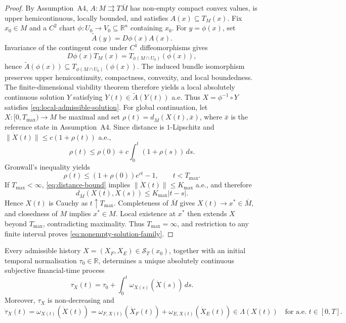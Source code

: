\documentclass[graybox,natbib]{SNmult}
\providecommand{\1}{}
\renewcommand{\1}{\mathbbm 1}
\begin{document}
\begin{proof}
By Assumption~A4, \(A:M\rightrightarrows T\overline M\) has non-empty compact
convex values, is upper hemicontinuous, locally bounded, and satisfies
\(A(x)\subseteq T_M(x)\). Fix \(x_0\in M\) and a \(C^2\) chart
\(\phi:U_0\to V_0\subseteq\mathbb R^n\) containing \(x_0\). For
\(y=\phi(x)\), set
\[
\widetilde A(y)=D\phi(x)A(x).
\]
Invariance of the contingent cone under \(C^1\) diffeomorphisms gives
\[
D\phi(x)T_M(x)
=
T_{\phi(M\cap U_0)}(\phi(x)),
\]
hence
\(\widetilde A(\phi(x))
\subseteq T_{\phi(M\cap U_0)}(\phi(x))\).
The induced bundle isomorphism preserves upper hemicontinuity, compactness,
convexity, and local boundedness. The finite-dimensional viability theorem
therefore yields a local absolutely continuous solution \(Y\) satisfying
\(\dot Y(t)\in\widetilde A(Y(t))\) a.e. Thus
\(X=\phi^{-1}\circ Y\) satisfies \eqref{eq:local-admissible-solution}. For global continuation, let \(X:[0,T_{\max})\to M\) be maximal and set
\(\rho(t)=d_{\overline M}(X(t),\bar x)\), where \(\bar x\) is the reference
state in Assumption~A4. Since distance is \(1\)-Lipschitz and
\(\|\dot X(t)\|\leq c(1+\rho(t))\) a.e.,
\[
\rho(t)
\leq
\rho(0)+c\int_0^t(1+\rho(s))\,ds.
\]
Gronwall's inequality yields
\begin{equation}
\rho(t)
\leq
(1+\rho(0))e^{ct}-1,
\qquad t<T_{\max}.
\label{eq:distance-bound}
\end{equation}
If \(T_{\max}<\infty\), \eqref{eq:distance-bound} implies
\(\|\dot X(t)\|\leq K_{\max}\) a.e., and therefore
\[
d_{\overline M}(X(t),X(s))
\leq
K_{\max}|t-s|.
\]
Hence \(X(t)\) is Cauchy as \(t\uparrow T_{\max}\). Completeness of
\(\overline M\) gives \(X(t)\to x^\ast\in\overline M\), and closedness of
\(M\) implies \(x^\ast\in M\). Local existence at \(x^\ast\) then extends
\(X\) beyond \(T_{\max}\), contradicting maximality. Thus
\(T_{\max}=\infty\), and restriction to any finite interval proves
\eqref{eq:nonempty-solution-family}.
\end{proof}




\begin{proposition}
\label{prop:temporal-process}

Every admissible history
\(X=(X_F,X_E)\in\mathcal S_T(x_0)\), together with an initial temporal
normalisation \(\tau_0\in\mathbb R\), determines a unique absolutely continuous
subjective financial-time process
\[
\tau_X(t)
=
\tau_0+
\int_0^t
\omega_{X(s)}\!\left(\dot X(s)\right)\,ds.
\]
Moreover, \(\tau_X\) is non-decreasing and
\begin{equation}
\dot\tau_X(t)
=
\omega_{X(t)}\!\left(\dot X(t)\right)
=
\omega_{F,X(t)}\!\left(\dot X_F(t)\right)
+
\omega_{E,X(t)}\!\left(\dot X_E(t)\right)
\in
\Lambda(X(t))
\quad
\text{for a.e. }t\in[0,T].
\label{eq:temporal-process-rate}
\end{equation}
\end{proposition}
\end{document}
